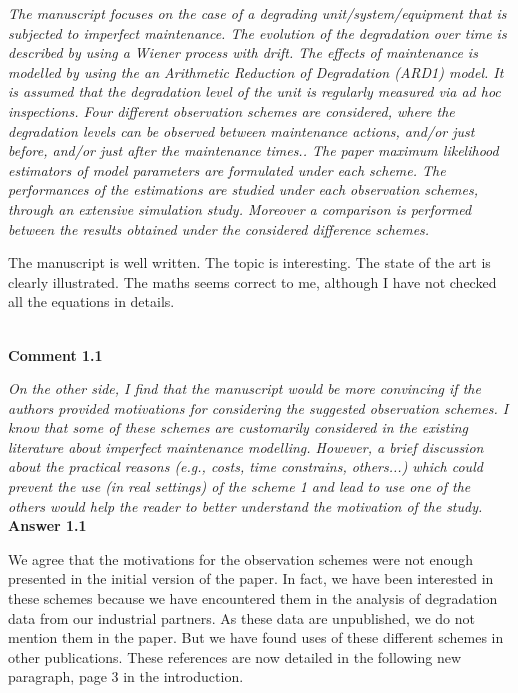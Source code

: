 {\it The manuscript focuses on the case of a degrading unit/system/equipment that is subjected to imperfect maintenance. The evolution of the degradation over time is described by using a Wiener process with drift. The effects of maintenance is modelled by using the an Arithmetic Reduction of Degradation (ARD1) model. It is assumed that the degradation level of the unit is regularly measured via ad hoc inspections.
Four different observation schemes are considered, where the degradation levels can be observed between maintenance actions, and/or just before, and/or just after the maintenance times.. The paper maximum likelihood estimators of model parameters are formulated under each scheme.
The performances of the estimations are studied under each observation schemes, through an extensive simulation study. Moreover a comparison is performed between the results obtained under the considered difference schemes.\\


The manuscript is well written. The topic is interesting. The state of the art is clearly illustrated. The maths seems correct to me, although I have not checked all the equations in details.}\\


{\bf Comment 1.1}

{\it On the other side, I find that the manuscript would be more convincing if the authors provided motivations for considering the suggested observation schemes. I know that some of these schemes are customarily considered in the existing literature about imperfect maintenance modelling. However, a brief discussion about the practical reasons (e.g., costs, time constrains, others...) which could prevent the use (in real settings) of the scheme 1 and lead to use one of the others would help the reader to better understand the motivation of the study.}\\

{\bf Answer 1.1}

We agree that the motivations for the observation schemes were not enough presented in the initial version of the paper. In fact, we have been interested in these schemes because we have encountered them in the analysis of degradation data from our industrial partners. As these data are unpublished, we do not mention them in the paper. But we have found uses of these different schemes in other publications. These references are now detailed in the following new paragraph, page 3 in the introduction.

